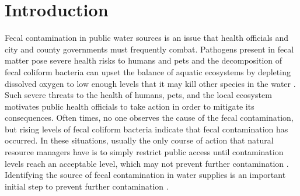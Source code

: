 \chapter{Introduction}\label{chap:introduction}
Fecal contamination in public water sources is an issue that health officials and city and county governments must frequently combat.
Pathogens present in fecal matter pose severe health risks to humans and pets
and
the decomposition of fecal coliform bacteria can upset the balance of aquatic ecosystems by depleting dissolved oxygen to low enough levels that it may kill other species in the water \cite{hubbard2004water}.
Such severe threats to the health of humans, pets, and the local ecosystem motivates public health officials to take action in order to mitigate its consequences.
Often times, no one observes the cause of the fecal contamination, but rising levels of fecal coliform bacteria indicate that fecal contamination has occurred.
In these situations, usually the only course of action that natural resource managers have is to simply restrict public access until contamination levels reach an acceptable level, which may not prevent further contamination \cite{rogers2005detecting}.
Identifying the source of fecal contamination in water supplies is an important initial step to prevent further contamination \cite{simpson2002microbial}.

